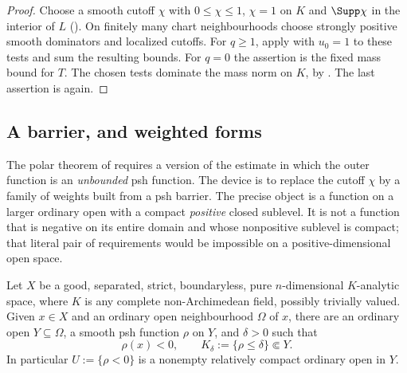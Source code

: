 \begin{proof}
Choose a smooth cutoff $\chi$ with $0\leq\chi\leq1$, $\chi=1$ on $K$ and
$\Supp\chi$ in the interior of $L$
().  On finitely many chart neighbourhoods
choose strongly positive smooth dominators and localized cutoffs.  For
$q\geq1$, apply  with $u_0=1$ to these
tests and sum the resulting bounds.  For $q=0$ the assertion is the fixed
mass bound for $T$.  The chosen tests dominate the mass norm on $K$, by
.  The last assertion is
 again.
\end{proof}

\subsection{A barrier, and weighted forms}
\label{sec:ch16-barrier}

The polar theorem of  requires a version of the
estimate in which the outer function is an \emph{unbounded} psh function.
The device is to replace the cutoff $\chi$ by a family of weights built from
a psh barrier.  The precise object is a function on a larger ordinary open
with a compact \emph{positive} closed sublevel.  It is not a function that is
negative on its entire domain and whose nonpositive sublevel is compact; that
literal pair of requirements would be impossible on a positive-dimensional
open space.

\begin{theorem}
\label{thm:ch16-barrier}
Let $X$ be a good, separated, strict, boundaryless, pure
$n$-dimensional $K$-analytic space, where $K$ is any complete
non-Archimedean field, possibly trivially valued.  Given $x\in X$ and an
ordinary open neighbourhood $\Omega$ of $x$, there are an ordinary open
$Y\subseteq\Omega$, a smooth psh function $\rho$ on $Y$, and $\delta>0$
such that
\[
             \rho(x)<0,
 \qquad K_\delta:=\{\rho\leq\delta\}\Subset Y .
\]
In particular $U:=\{\rho<0\}$ is a nonempty relatively compact ordinary
open in $Y$.
\end{theorem}

